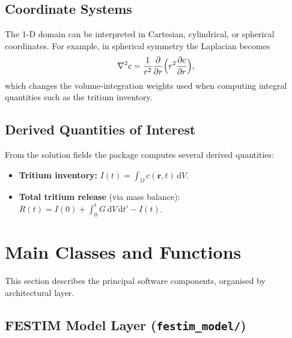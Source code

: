 \documentclass[11pt,a4paper]{article}
\begin{document}
\subsection{Coordinate Systems}

The 1-D domain can be interpreted in Cartesian, cylindrical, or spherical
coordinates.  For example, in spherical symmetry the Laplacian becomes
\begin{equation}
  \nabla^2 c = \frac{1}{r^2}\frac{\partial}{\partial r}
               \Bigl(r^2 \frac{\partial c}{\partial r}\Bigr),
\end{equation}
which changes the volume-integration weights used when computing integral
quantities such as the tritium inventory.

\subsection{Derived Quantities of Interest}

From the solution fields the package computes several derived quantities:
\begin{itemize}[nosep]
  \item \textbf{Tritium inventory:}
        $\displaystyle I(t) = \int_\Omega c(\mathbf{r},t)\,\mathrm{d}V$.
  \item \textbf{Total tritium release} (via mass balance):
        $R(t) = I(0) + \int_0^t G\,\mathrm{d}V\,\mathrm{d}t' - I(t)$.
\end{itemize}


\section{Main Classes and Functions}
\label{sec:classes}

This section describes the principal software components, organised by
architectural layer.

\subsection{FESTIM Model Layer (\texttt{festim\_model/})}
\end{document}
